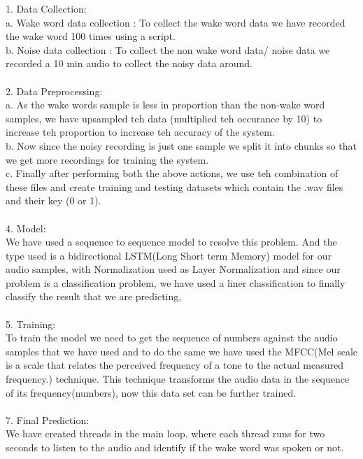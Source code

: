 \documentclass[fleqn,10pt]{SelfArx} %
\begin{document}
 

1. Data Collection:  \\
    a. Wake word data collection : To collect the wake word data we have recorded the wake word 100 times using a script. \\
    b. Noise data collection : To collect the non wake word data/ noise data we recorded a 10 min audio to collect the noisy data around. \\ \\

 

2. Data Preprocessing: \\
    a. As the wake words sample is less in proportion than the non-wake word samples, we have upsampled teh data (multiplied teh occurance by 10) to increase teh proportion to increase teh accuracy of the system. \\
    b. Now since the noisy recording is just one sample we split it into chunks so that we get more recordings for training the system. \\
    c. Finally after performing both the above actions, we use teh combination of these files and create training and testing datasets which contain the .wav files and their key (0 or 1). \\ \\

 

4. Model: \\
    We have used a sequence to sequence model to resolve this problem. And the type used is a bidirectional LSTM(Long Short term Memory) model for our audio samples, with Normalization used as Layer Normalization and since our problem is a classification problem, we have used a liner classification to finally classify the result that we are predicting,
 \\ \\
 

5. Training: \\
    To train the model we need to get the sequence of numbers against the audio samples that we have used and to do the same we have used the 
    MFCC(Mel scale is a scale that relates the perceived frequency of a tone to the actual measured frequency.) technique. This technique transforms the audio data in the sequence of its frequency(numbers), now this data set can be further trained. \\ \\

 

7. Final Prediction: \\
    We have created threads in the main loop, where each thread runs for two seconds to listen to the audio and identify if the wake word was spoken or not. \\ \\
\end{document}
